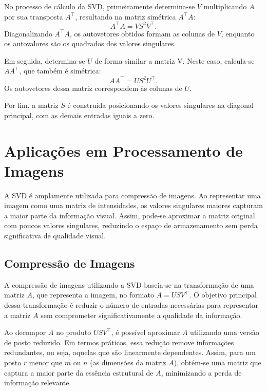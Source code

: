 No processo de cálculo da SVD, primeiramente determina-se \( V \) multiplicando \( A \) por sua transposta \( A^\top \), resultando na matriz simétrica \( A^\top A \):
\begin{equation}
  A^\top A = V S^2 V^\top.
\end{equation}
Diagonalizando \( A^\top A \), os autovetores obtidos formam as colunas de \( V \), enquanto os autovalores são os quadrados dos valores singulares.

Em seguida, determina-se \( U \) de forma similar a matriz V. Neste caso, calcula-se \( A A^\top \), que também é simétrica:
\begin{equation}
  A A^\top = U S^2 U^\top.
\end{equation}
Os autovetores dessa matriz correspondem às colunas de \( U \).

Por fim, a matriz \( S \) é construída posicionando os valores singulares na diagonal principal, com as demais entradas iguais a zero.

\section{Aplicações em Processamento de Imagens}

A SVD é amplamente utilizada para compressão de imagens. Ao representar uma imagem como uma matriz de intensidades, os valores singulares maiores capturam a maior parte da informação visual. Assim, pode-se aproximar a matriz original com poucos valores singulares, reduzindo o espaço de armazenamento sem perda significativa de qualidade visual.

\subsection{Compressão de Imagens}

A compressão de imagens utilizando a SVD baseia-se na transformação de uma matriz \( A \), que representa a imagem, no formato \( A = U S V^\top \). O objetivo principal dessa transformação é reduzir o número de entradas necessárias para representar a matriz \( A \) sem comprometer significativamente a qualidade da informação.

Ao decompor \( A \) no produto \( U S V^\top \), é possível aproximar \( A \) utilizando uma versão de posto reduzido. Em termos práticos, essa redução remove informações redundantes, ou seja, aquelas que são linearmente dependentes. Assim, para um posto \( r \) menor que \( m \) ou \( n \) (as dimensões da matriz \( A \)), obtém-se uma matriz que captura a maior parte da essência estrutural de \( A \), minimizando a perda de informação relevante.

